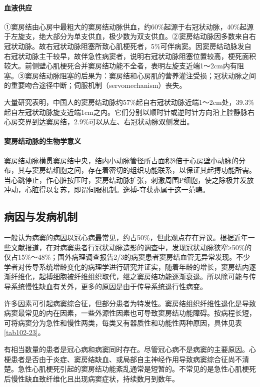 \paragraph{血液供应}

①窦房结由心房中最粗大的窦房结动脉供血，约60\%起源于右冠状动脉，40\%起源于左旋支，绝大部分为单支供血，极少数为双支供血。②窦房结动脉因多数来自右冠状动脉。故右冠状动脉阻塞所致心肌梗死者，5\%可伴病窦。因窦房结动脉发自右冠状动脉主干较早，故伴急性病窦者，说明右冠状动脉阻塞位置较高，梗死面积较大。前侧壁心肌梗死合并窦房结功能不全者，表明左旋支近端1～2cm内有阻塞。③窦房结动脉阻塞的后果为：窦房结和心房肌的营养灌注受损；冠状动脉之间的重要吻合途径中断；伺服机制（servomechanism）丧失。

大量研究表明，中国人的窦房结动脉约57\%起自右冠状动脉近端1～2cm处，39.3\%起自左冠状动脉旋支近端1cm之内。它们分别以顺时针或逆时针方向沿上腔静脉右心房交界到达窦房结，2.9\%可以从左、右冠状动脉双侧发出。

\paragraph{窦房结动脉的生物学意义}

窦房结动脉横贯窦房结中央，结内小动脉管径所占面积8倍于心房壁小动脉的分布，其与窦房结细胞之间，存在着密切的组织功能联系，以保证其起搏功能所需。当心跳停止，作心脏按压时，窦房结动脉扩张，刺激周围P细胞，使之除极并发放冲动，心脏得以复苏，即谓伺服机制。逸搏-夺获亦属于这一范畴。

\subsection{病因与发病机制}

一般认为病窦的病因以冠心病最常见，约占50\%，但此观点存在异议。根据近年一些文献报道，在对病窦患者行冠状动脉造影的调查中，发现冠状动脉狭窄≥50\%的仅占15\%～48\%；国外病理调查报告2/3的病窦患者窦房结血管无异常发现。不少学者对传导系统增龄变化的病理学进行研究并证实，随着年龄的增长，窦房结内逐渐纤维化，起搏细胞被纤维组织取代，继之窦房结功能逐渐衰退。所以除可能与传导系统慢性缺血有关外，更多的原因是由于传导系统退行性病变。

许多因素可引起病窦综合征，但部分患者为特发性。窦房结组织纤维性退化是导致病窦最常见的内在因素，一些外源性因素也可导致窦房结功能障碍。按病程长短，可将病窦分为急性和慢性两类，每类又有器质性和功能性两种原因，具体见表\ref{tab102-23}。

有相当数量的患者是冠心病和病窦同时存在。尽管冠心病不是病窦的主要原因。心梗患者是否由于炎症、窦房结缺血、或局部自主神经作用导致病窦综合征尚不清楚。急性心肌梗死引起的窦房结功能紊乱通常是短暂的。不常见的是急性心肌梗死后慢性缺血致纤维化且出现病窦症状，持续数月到数年。

